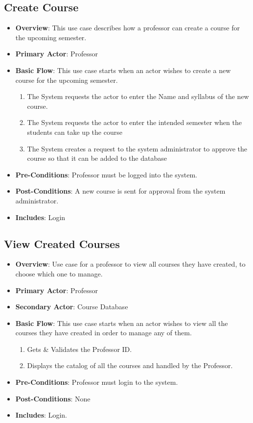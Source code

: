 \documentclass[12pt, a4]{article}
\begin{document}
\subsection{Create Course}
\begin{itemize}
    \item \textbf{Overview}: This use case describes how a professor can create a course for the upcoming semester.
    \item \textbf{Primary Actor}: Professor
    \item \textbf{Basic Flow}: This use case starts when an actor wishes to create a new course for the upcoming semester.
        \begin{enumerate}
            \item The System requests the actor to enter the Name and syllabus of the new course.
            \item The System requests the actor to enter the intended semester when the students can take up the course
            \item The System creates a request to the system administrator to approve the course so that it can be added to the database
        \end{enumerate}
    \item \textbf{Pre-Conditions}: Professor must be logged into the system.
    \item \textbf{Post-Conditions}: A new course is sent for approval from the system administrator.
    \item \textbf{Includes}: Login
\end{itemize}

\subsection{View Created Courses}
\begin{itemize}
    \item \textbf{Overview}: Use case for a professor to view all courses they have created, to choose which one to manage.
    \item \textbf{Primary Actor}: Professor
    \item \textbf{Secondary Actor}: Course Database
    \item \textbf{Basic Flow}: This use case starts when an actor wishes to view all the courses they have created in order to manage any of them.
        \begin{enumerate}
            \item Gets \& Validates the Professor ID.
            \item Displays the catalog of all the courses and handled by the Professor.
        \end{enumerate}
    \item \textbf{Pre-Conditions}: Professor must login to the system.
    \item \textbf{Post-Conditions}: None
    \item \textbf{Includes}: Login.
\end{itemize}
\end{document}
